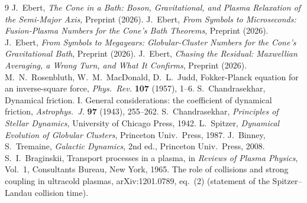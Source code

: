 \documentclass[12pt]{amsart}
\theoremstyle{plain}
\theoremstyle{remark}
\begin{document}
\begin{thebibliography}{9}
 J.~Ebert, \emph{The Cone in a Bath: Boson, Gravitational, and Plasma Relaxation of the Semi-Major Axis}, Preprint (2026).
 J.~Ebert, \emph{From Symbols to Microseconds: Fusion-Plasma Numbers for the Cone's Bath Theorems}, Preprint (2026).
 J.~Ebert, \emph{From Symbols to Megayears: Globular-Cluster Numbers for the Cone's Gravitational Bath}, Preprint (2026).
 J.~Ebert, \emph{Chasing the Residual: Maxwellian Averaging, a Wrong Turn, and What It Confirms}, Preprint (2026).
 M.~N.~Rosenbluth, W.~M.~MacDonald, D.~L.~Judd, Fokker-Planck equation for an inverse-square force, \emph{Phys.\ Rev.} \textbf{107} (1957), 1--6.
 S.~Chandrasekhar, Dynamical friction. I. General considerations: the coefficient of dynamical friction, \emph{Astrophys.\ J.} \textbf{97} (1943), 255--262.
 S.~Chandrasekhar, \emph{Principles of Stellar Dynamics}, University of Chicago Press, 1942.
 L.~Spitzer, \emph{Dynamical Evolution of Globular Clusters}, Princeton Univ.\ Press, 1987.
 J.~Binney, S.~Tremaine, \emph{Galactic Dynamics}, 2nd ed., Princeton Univ.\ Press, 2008.
 S.~I.~Braginskii, Transport processes in a plasma, in \emph{Reviews of Plasma Physics}, Vol.\ 1, Consultants Bureau, New York, 1965.
 The role of collisions and strong coupling in ultracold plasmas, arXiv:1201.0789, eq.\ (2) (statement of the Spitzer--Landau collision time).
\end{thebibliography}
\end{document}
